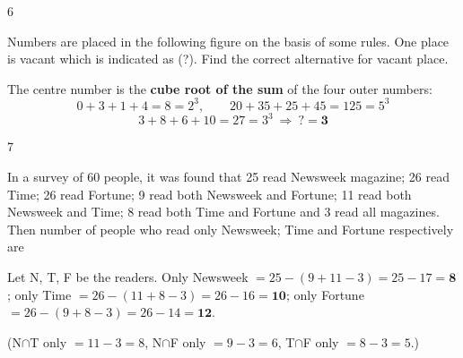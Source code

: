 \begin{question}{6}
{Numbers are placed in the following figure on the basis of some rules. One place is vacant which is indicated as (?). Find the correct alternative for vacant place.\par}
\begin{explain}
The centre number is the \textbf{cube root of the sum} of the four outer numbers:
\[0+3+1+4=8=2^3,\qquad 20+35+25+45=125=5^3\]
\[3+8+6+10=27=3^3\ \Rightarrow\ ?=\mathbf{3}\]
\end{explain}
\end{question}

\begin{question}{7}
{In a survey of 60 people, it was found that 25 read Newsweek magazine; 26 read Time; 26 read Fortune; 9 read both Newsweek and Fortune; 11 read both Newsweek and Time; 8 read both Time and Fortune and 3 read all magazines. Then number of people who read only Newsweek; Time and Fortune respectively are\par}
\begin{explain}
Let N, T, F be the readers. Only Newsweek $=25-(9+11-3)=25-17=\mathbf{8}$; only Time $=26-(11+8-3)=26-16=\mathbf{10}$; only Fortune $=26-(9+8-3)=26-14=\mathbf{12}$.
\begin{center}
\end{center}
(N$\cap$T only $=11-3=8$, N$\cap$F only $=9-3=6$, T$\cap$F only $=8-3=5$.)
\end{explain}
\end{question}

